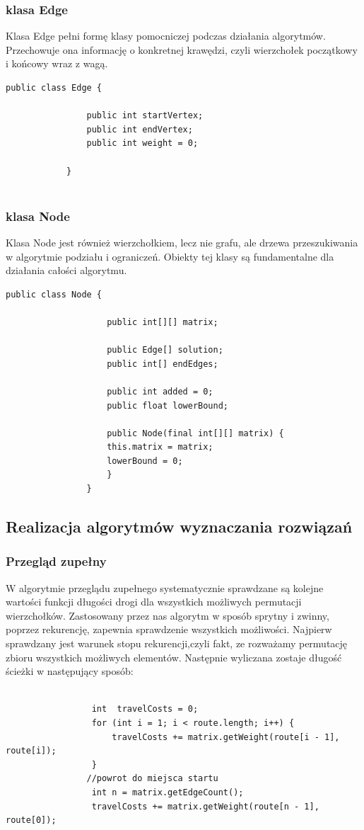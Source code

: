 \documentclass{article}
\begin{document}
		\subsubsection{klasa Edge}
		
		Klasa Edge pełni formę klasy pomocniczej podczas działania algorytmów. Przechowuje ona informację o konkretnej krawędzi, czyli wierzchołek początkowy i końcowy wraz z wagą.
			\begin{lstlisting}[xleftmargin=-100pt]
			public class Edge {
			
				public int startVertex;
				public int endVertex;
				public int weight = 0;
						
			}
			
			\end{lstlisting}
		\subsubsection{klasa Node}
			Klasa Node jest również wierzchołkiem, lecz nie grafu, ale drzewa przeszukiwania w algorytmie podziału i ograniczeń. Obiekty tej klasy są fundamentalne dla działania całości algorytmu. 
				\begin{lstlisting}[xleftmargin=-150pt]
				public class Node {
					
					public int[][] matrix;
					
					public Edge[] solution;
					public int[] endEdges;
					
					public int added = 0;
					public float lowerBound;
					
					public Node(final int[][] matrix) {
					this.matrix = matrix;
					lowerBound = 0;
					}
				}
				\end{lstlisting}
	\subsection{Realizacja algorytmów wyznaczania rozwiązań}
		\subsubsection{Przegląd zupełny}
				W algorytmie przeglądu zupełnego systematycznie sprawdzane są kolejne wartości funkcji długości drogi dla wszystkich możliwych permutacji wierzchołków. Zastosowany przez nas algorytm w sposób sprytny i zwinny, poprzez rekurencję, zapewnia sprawdzenie wszystkich możliwości. Najpierw sprawdzany jest warunek stopu rekurencji,czyli fakt, ze rozważamy permutację zbioru wszystkich możliwych elementów. Następnie wyliczana zostaje długość ścieżki w następujący sposób:
				\begin{lstlisting}[xleftmargin=-150pt]
				
				 int  travelCosts = 0;
				 for (int i = 1; i < route.length; i++) {
					 travelCosts += matrix.getWeight(route[i - 1], route[i]);
				 }
				//powrot do miejsca startu
				 int n = matrix.getEdgeCount();
				 travelCosts += matrix.getWeight(route[n - 1], route[0]);
				\end{lstlisting}
\end{document}
